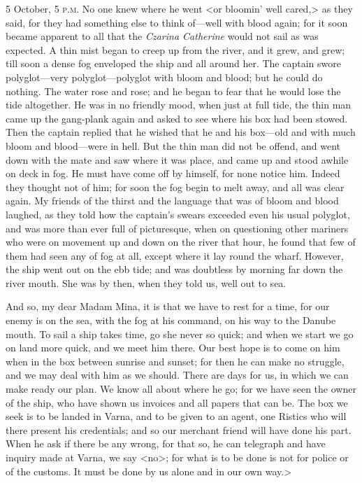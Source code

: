 \begin{diary}{5 October, 5 \textsc{p.m.}}
No one knew where he went <or bloomin' well cared,> as they said, for they had something else to think of—well with blood again; for it soon became apparent to all that the \textit{Czarina Catherine} would not sail as was expected. A thin mist began to creep up from the river, and it grew, and grew; till soon a dense fog enveloped the ship and all around her. The captain swore polyglot—very polyglot—polyglot with bloom and blood; but he could do nothing. The water rose and rose; and he began to fear that he would lose the tide altogether. He was in no friendly mood, when just at full tide, the thin man came up the gang-plank again and asked to see where his box had been stowed. Then the captain replied that he wished that he and his box—old and with much bloom and blood—were in hell. But the thin man did not be offend, and went down with the mate and saw where it was place, and came up and stood awhile on deck in fog. He must have come off by himself, for none notice him. Indeed they thought not of him; for soon the fog begin to melt away, and all was clear again. My friends of the thirst and the language that was of bloom and blood laughed, as they told how the captain's swears exceeded even his usual polyglot, and was more than ever full of picturesque, when on questioning other mariners who were on movement up and down on the river that hour, he found that few of them had seen any of fog at all, except where it lay round the wharf. However, the ship went out on the ebb tide; and was doubtless by morning far down the river mouth. She was by then, when they told us, well out to sea.

And so, my dear Madam Mina, it is that we have to rest for a time, for our enemy is on the sea, with the fog at his command, on his way to the Danube mouth. To sail a ship takes time, go she never so quick; and when we start we go on land more quick, and we meet him there. Our best hope is to come on him when in the box between sunrise and sunset; for then he can make no struggle, and we may deal with him as we should. There are days for us, in which we can make ready our plan. We know all about where he go; for we have seen the owner of the ship, who have shown us invoices and all papers that can be. The box we seek is to be landed in Varna, and to be given to an agent, one Ristics who will there present his credentials; and so our merchant friend will have done his part. When he ask if there be any wrong, for that so, he can telegraph and have inquiry made at Varna, we say <no>; for what is to be done is not for police or of the customs. It must be done by us alone and in our own way.>


\end{diary}
